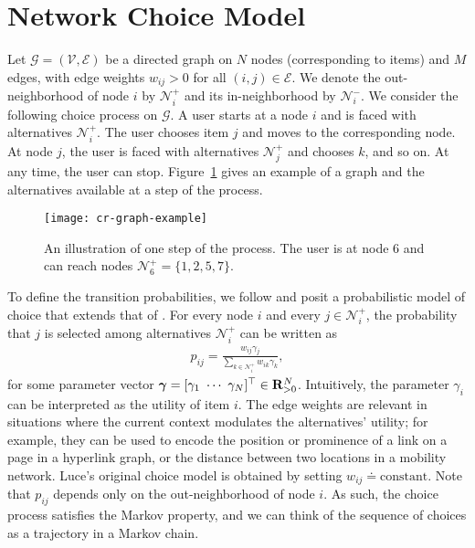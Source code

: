 \section{Network Choice Model}  %
\label{cr:sec:model}

Let $\mathcal{G} = (\mathcal{V}, \mathcal{E})$ be a directed graph on $N$ nodes (corresponding to items) and $M$ edges, with edge weights $w_{ij} > 0$ for all $(i, j) \in \mathcal{E}$.
We denote the out-neighborhood of node $i$ by $\mathcal{N}^+_i$ and its in-neighborhood by $\mathcal{N}^-_i$.
We consider the following choice process on $\mathcal{G}$.
A user starts at a node $i$ and is faced with alternatives $\mathcal{N}^+_i$.
The user chooses item $j$ and moves to the corresponding node.
At node $j$, the user is faced with alternatives $\mathcal{N}^+_j$ and chooses $k$, and so on.
At any time, the user can stop.
Figure~\ref{cr:fig:samplenet} gives an example of a graph and the alternatives available at a step of the process.

\begin{figure}
  \centering
  \texttt{[image: cr-graph-example]}
  \caption{An illustration of one step of the process.
  The user is at node 6 and can reach nodes $\mathcal{N}^+_6 = \{1, 2, 5, 7\}$.}
  \label{cr:fig:samplenet}
\end{figure}

To define the transition probabilities, we follow \citet{kumar2015inverting} and posit a probabilistic model of choice that extends that of \citet{luce1959individual}.
For every node $i$ and every $j \in \mathcal{N}^+_i$, the probability that $j$ is selected among alternatives $\mathcal{N}^+_i$ can be written as
\begin{align}
\label{cr:eq:singlelik}
p_{ij} = \frac{w_{ij} \gamma_j}{\sum_{k \in \mathcal{N}^+_i} w_{ik} \gamma_k},
\end{align}
for some parameter vector $\bm{\gamma} = [\gamma_1 \ \cdots \ \gamma_N]^\Tr \in \mathbf{R}_{>0}^N$.
Intuitively, the parameter $\gamma_i$ can be interpreted as the utility of item $i$.
The edge weights are relevant in situations where the current context modulates the alternatives' utility;
for example, they can be used to encode the position or prominence of a link on a page in a hyperlink graph, or the distance between two locations in a mobility network.
Luce's original choice model is obtained by setting $w_{ij} \doteq \text{constant}$.
Note that $p_{ij}$ depends only on the out-neighborhood of node $i$.
As such, the choice process satisfies the Markov property, and we can think of the sequence of choices as a trajectory in a Markov chain.

